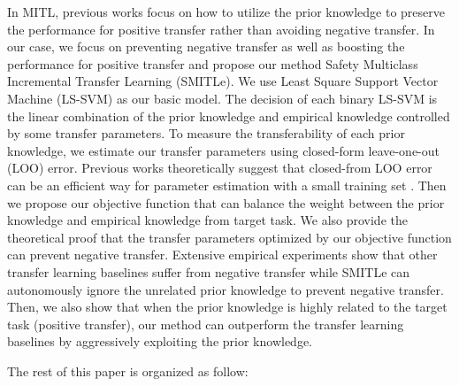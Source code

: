 In MITL, previous works focus on how to utilize the prior knowledge to preserve the performance for positive transfer rather than avoiding negative transfer. In our case, we focus on preventing negative transfer as well as boosting the performance for positive transfer and propose our method Safety Multiclass Incremental Transfer Learning (SMITLe). 
We use Least Square Support Vector Machine (LS-SVM) \cite{suykens1999least} as our basic model. The decision of each binary LS-SVM is the linear combination of the prior knowledge and empirical knowledge controlled by some transfer parameters. To measure the transferability of each prior knowledge, we estimate our transfer parameters using closed-form leave-one-out (LOO) error. Previous works theoretically suggest that closed-from LOO error can be an efficient way for parameter estimation with a small training set \cite{kuzborskij2013stability} \cite{cawley2006leave}. Then we propose our objective function that can balance the weight between the prior knowledge and empirical knowledge from target task. We also provide the theoretical proof that the transfer parameters optimized by our objective function can prevent negative transfer. Extensive empirical experiments show that other transfer learning baselines suffer from negative transfer while SMITLe can autonomously ignore the unrelated prior knowledge to prevent negative transfer. Then, we also show that when the prior knowledge is highly related to the target task (positive transfer), our method can outperform the transfer learning baselines by aggressively exploiting the prior knowledge.

The rest of this paper is organized as follow:
  


